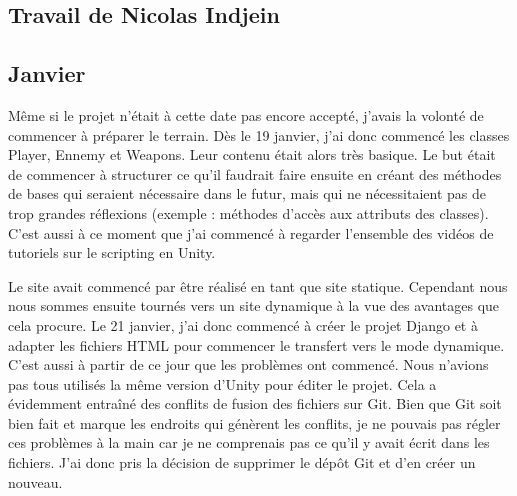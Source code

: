 \documentclass[]{extarticle}
\begin{document}
\begin{spacing}{1.25}
\section{Travail de Nicolas Indjein}

\subsection{Janvier}
\bigbreak
\bigbreak

Même si le projet n’était à cette date pas encore accepté, j’avais la volonté de commencer à préparer le terrain. Dès le 19 janvier, j’ai donc commencé les classes Player, Ennemy et Weapons. Leur contenu était alors très basique. Le but était de commencer à structurer ce qu'il faudrait faire ensuite en créant des méthodes de bases qui seraient nécessaire dans le futur, mais qui ne nécessitaient pas de trop grandes réflexions (exemple : méthodes d’accès aux attributs des classes). C’est aussi à ce moment que j'ai commencé à regarder l’ensemble des vidéos de tutoriels sur le scripting en Unity.
\bigbreak

\bigbreak
\bigbreak

Le site avait commencé par être réalisé en tant que site statique. Cependant nous nous sommes ensuite tournés vers un site dynamique à la vue des avantages que cela procure. Le 21 janvier, j'ai donc commencé à créer le projet Django et à adapter les fichiers HTML pour commencer le transfert vers le mode dynamique. C'est aussi à partir de ce jour que les problèmes ont commencé.  Nous n'avions pas tous utilisés la même version d'Unity pour éditer le projet. Cela a évidemment entraîné des conflits de fusion des fichiers sur Git. Bien que Git soit bien fait et marque les endroits qui génèrent les conflits, je ne pouvais pas régler ces problèmes à la main car je ne comprenais pas ce qu'il y avait écrit dans les fichiers. J’ai donc pris la décision de supprimer le dépôt Git et d’en créer un nouveau.
\bigbreak



\end{spacing}
\end{document}

